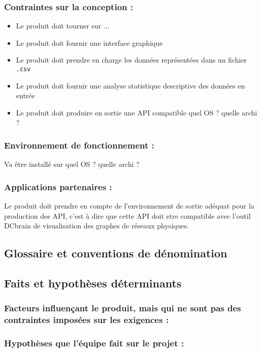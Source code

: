 			\subsubsection{Contraintes sur la conception :} 
				\begin{itemize}
					\item Le produit doit tourner sur ...
					\item Le produit doit fournir une interface graphique
					\item Le produit doit prendre en charge les données représentées dans un fichier \lstinline!.csv!
					\item Le produit doit fournir une analyse statistique descriptive des données en entrée
					\item Le produit doit produire en sortie une API compatible
					quel OS ? quelle archi ?
				\end{itemize}
			\subsubsection{Environnement de fonctionnement :} Va être installé sur quel OS ? quelle archi ?
			\subsubsection{Applications partenaires :} 
			Le produit doit prendre en compte de l'environnement de sortie adéquat pour la production des API, c'est à dire que cette API doit etre compatible avec l'outil DCbrain de visualisation des graphes de réseaux physiques.
		
		\subsection{Glossaire et conventions de dénomination}
		
		\subsection{Faits et hypothèses déterminants}
			\subsubsection{Facteurs influençant le produit, mais qui ne sont pas des contraintes imposées sur les exigences :}
			\subsubsection{Hypothèses que l’équipe fait sur le projet :}
		
